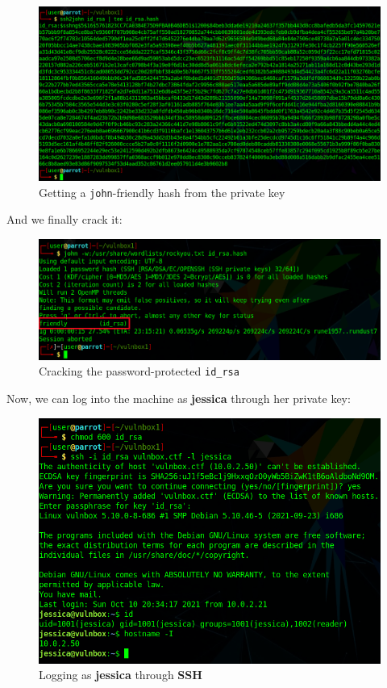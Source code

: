 \documentclass[12pt]{article}
\begin{document}
    \begin{figure}[H]\label{pic:58-ssh2john}
        \centering
        \includegraphics[width=1.00\textwidth]{58-ssh2john.png}
        \caption{Getting a \texttt{john}-friendly hash from the private key}
    \end{figure}

    And we finally crack it:

    \begin{figure}[H]\label{pic:59-john-id_rsa}
        \centering
        \includegraphics[width=1.00\textwidth]{59-john-id_rsa.png}
        \caption{Cracking the password-protected \texttt{id\_rsa}}
    \end{figure}

    Now, we can log into the machine as \textbf{jessica} through her private
    key:

    \begin{figure}[H]\label{pic:60-ssh-jessica}
        \centering
        \includegraphics[width=1.00\textwidth]{60-ssh-jessica.png}
        \caption{Logging as \textbf{jessica} through \textbf{SSH}}
    \end{figure}
\end{document}
